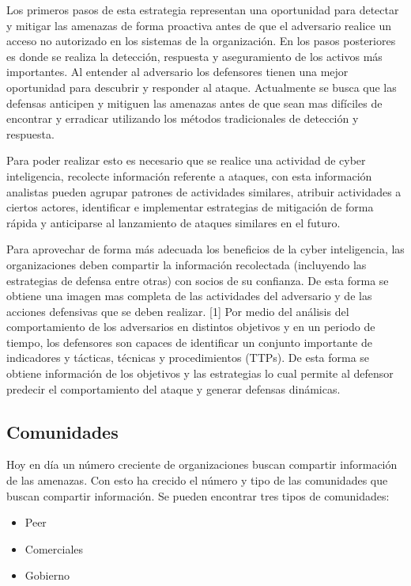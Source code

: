 Los primeros pasos de esta estrategia representan una oportunidad para detectar 
y mitigar las amenazas de forma proactiva antes de que el adversario realice un 
acceso no autorizado en los sistemas de la organización. En los pasos 
posteriores es donde se realiza la detección, respuesta y aseguramiento de los 
activos más importantes. Al entender al adversario los defensores tienen una 
mejor oportunidad para descubrir y responder al ataque. Actualmente se busca que 
las defensas anticipen y mitiguen las amenazas antes de que sean mas difíciles 
de encontrar y erradicar utilizando los métodos tradicionales de detección y 
respuesta.

Para poder realizar esto es necesario que se realice una actividad de cyber inteligencia,
recolecte información referente a ataques, con esta información analistas pueden 
agrupar patrones de actividades similares, atribuir actividades a ciertos actores, 
identificar e implementar estrategias de mitigación de forma rápida y anticiparse al 
lanzamiento de ataques similares en el futuro.

Para aprovechar de forma más adecuada los beneficios de la cyber inteligencia, 
las organizaciones deben compartir la información recolectada (incluyendo las 
estrategias de defensa entre otras) con socios de su confianza. De esta forma se 
obtiene una imagen mas completa de las actividades del adversario y de las 
acciones defensivas que se deben realizar. [1] Por medio del análisis del 
comportamiento de los adversarios en distintos objetivos y en un periodo de 
tiempo, los defensores son capaces de identificar un conjunto importante de 
indicadores y tácticas, técnicas y procedimientos (TTPs). De esta forma se 
obtiene información de los objetivos y las estrategias lo cual permite al 
defensor predecir el comportamiento del ataque y generar defensas dinámicas.

\subsection{Comunidades}
Hoy en día un número creciente de organizaciones buscan compartir información de 
las amenazas. Con esto ha crecido el número y tipo de las comunidades que buscan 
compartir información. Se pueden encontrar tres tipos de comunidades:
\begin{itemize}
  \item Peer
  \item Comerciales
  \item Gobierno
\end{itemize}

